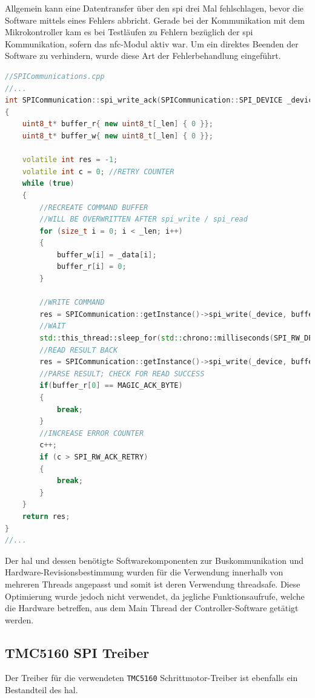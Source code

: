 Allgemein kann eine Datentransfer über den \gls{spi} drei Mal
fehlschlagen, bevor die Software mittels eines Fehlers abbricht. Gerade
bei der Kommunikation mit dem Mikrokontroller kam es bei Testläufen zu
Fehlern bezüglich der \gls{spi} Kommunikation, sofern das
\gls{nfc}-Modul aktiv war. Um ein direktes Beenden der Software zu
verhindern, wurde diese Art der Fehlerbehandlung eingeführt.

\begin{lstlisting}[language={C++}]
//SPICommunications.cpp
//...
int SPICommunication::spi_write_ack(SPICommunication::SPI_DEVICE _device, uint8_t* _data, int _len)
{
    uint8_t* buffer_r{ new uint8_t[_len] { 0 }};
    uint8_t* buffer_w{ new uint8_t[_len] { 0 }};

    volatile int res = -1;
    volatile int c = 0; //RETRY COUNTER
    while (true)
    {
        //RECREATE COMMAND BUFFER
        //WILL BE OVERWRITTEN AFTER spi_write / spi_read
        for (size_t i = 0; i < _len; i++)
        {
            buffer_w[i] = _data[i];
            buffer_r[i] = 0;
        }
        
        //WRITE COMMAND
        res = SPICommunication::getInstance()->spi_write(_device, buffer_w, _len);
        //WAIT
        std::this_thread::sleep_for(std::chrono::milliseconds(SPI_RW_DELAY));
        //READ RESULT BACK
        res = SPICommunication::getInstance()->spi_write(_device, buffer_r, _len);
        //PARSE RESULT; CHECK FOR READ SUCCESS
        if(buffer_r[0] == MAGIC_ACK_BYTE)
        {
            break;
        }
        //INCREASE ERROR COUNTER
        c++;
        if (c > SPI_RW_ACK_RETRY)
        {
            break;
        }
    }
    return res;
}
//...
\end{lstlisting}

Der \gls{hal} und dessen benötigte Softwarekomponenten zur
Buskommunikation und Hardware-Revisionsbestimmung wurden für die
Verwendung innerhalb von mehreren Threads angepasst und somit ist deren
Verwendung threadsafe. Diese Optimierung wurde jedoch nicht verwendet,
da jegliche Funktionsaufrufe, welche die Hardware betreffen, aus dem
Main Thread der Controller-Software getätigt werden.

\hypertarget{tmc5160-spi-treiber}{%
\subsection{TMC5160 SPI Treiber}\label{tmc5160-spi-treiber}}

Der Treiber für die verwendeten \passthrough{\lstinline!TMC5160!}
Schrittmotor-Treiber ist ebenfalls ein Bestandteil des \gls{hal}.

